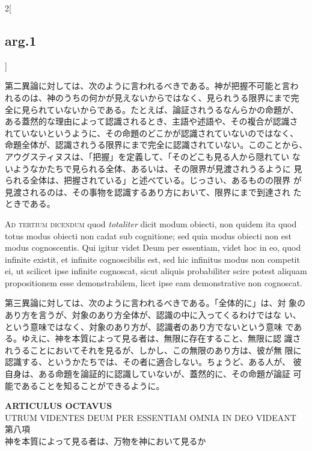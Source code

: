 \documentclass[paper=a4paper,fontsize=10pt,jafontsize=9pt,titlepage]{jlreq}
\begin{document}
\begin{paracol}{2}[\subsection{arg.1}]
\switchcolumn

第二異論に対しては、次のように言われるべきである。神が把握不可能と言わ
れるのは、神のうちの何かが見えないからではなく、見られうる限界にまで完
全に見られていないからである。たとえば、論証されうるなんらかの命題が、
ある蓋然的な理由によって認識されるとき、主語や述語や、その複合が認識さ
れていないというように、その命題のどこかが認識されていないのではなく、
命題全体が、認識されうる限界にまで完全に認識されていない。このことから、
アウグスティヌスは、「把握」を定義して、「そのどこも見る人から隠れてい
ないようなかたちで見られる全体、あるいは、その限界が見渡されうるように
見られる全体は、把握されている」と述べている。じっさい、あるものの限界
が見渡されるのは、その事物を認識するあり方において、限界にまで到達され
たときである。

\switchcolumn*[\subsection{ad.3}]

{\scshape Ad tertium dicendum} quod {\itshape totaliter} dicit modum obiecti,
non quidem ita quod totus modus obiecti non cadat sub cognitione; sed
quia modus obiecti non est modus cognoscentis. Qui igitur videt Deum
per essentiam, videt hoc in eo, quod infinite existit, et infinite
cognoscibilis est, sed hic infinitus modus non competit ei, ut
scilicet ipse infinite cognoscat, sicut aliquis probabiliter scire
potest aliquam propositionem esse demonstrabilem, licet ipse eam
demonstrative non cognoscat.

\switchcolumn

第三異論に対しては、次のように言われるべきである。「全体的に」は、対
象のあり方を言うが、対象のあり方全体が、認識の中に入ってくるわけではな
い、という意味ではなく、対象のあり方が、認識者のあり方でないという意味
である。ゆえに、神を本質によって見る者は、無限に存在すること、無限に認
識されうることにおいてそれを見るが、しかし、この無限のあり方は、彼が無
限に認識する、というかたちでは、その者に適合しない。ちょうど、ある人が、
彼自身は、ある命題を論証的に認識していないが、蓋然的に、その命題が論証
可能であることを知ることができるように。

\end{paracol}

\newpage
{}

\begin{center}
 {\Large {\bfseries ARTICULUS OCTAVUS}}\\
{\large UTRUM VIDENTES DEUM PER ESSENTIAM OMNIA IN DEO VIDEANT\\
第八項\\
神を本質によって見る者は、万物を神において見るか}
\end{center}
\end{document}
